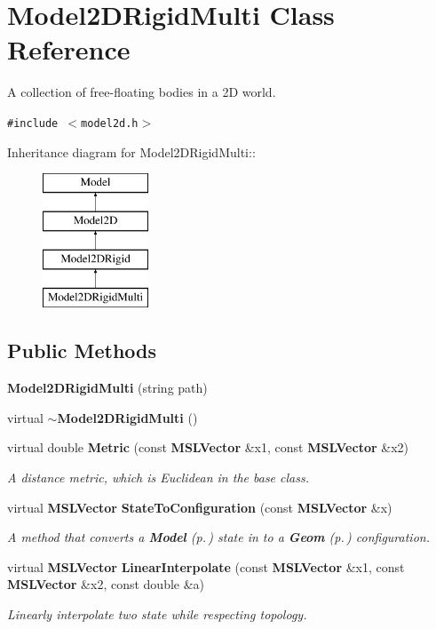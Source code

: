 \section{Model2DRigid\-Multi  Class Reference}
\label{class_Model2DRigidMulti}
A collection of free-floating bodies in a 2D world. 


{\tt \#include $<$model2d.h$>$}

Inheritance diagram for Model2DRigid\-Multi::\begin{figure}[H]
\begin{center}
\leavevmode
\includegraphics[height=4cm]{class_Model2DRigidMulti}
\end{center}
\end{figure}
\subsection*{Public Methods}
\begin{CompactItemize}
\item 
{\bf Model2DRigid\-Multi} (string path)
\item 
virtual {\bf $\sim$Model2DRigid\-Multi} ()
\item 
virtual double {\bf Metric} (const {\bf MSLVector} \&x1, const {\bf MSLVector} \&x2)
\begin{CompactList}\small\item\em A distance metric, which is Euclidean in the base class.\item\end{CompactList}\item 
virtual {\bf MSLVector} {\bf State\-To\-Configuration} (const {\bf MSLVector} \&x)
\begin{CompactList}\small\item\em A method that converts a {\bf Model} {\rm (p.\,\pageref{class_Model})} state in to a {\bf Geom} {\rm (p.\,\pageref{class_Geom})} configuration.\item\end{CompactList}\item 
virtual {\bf MSLVector} {\bf Linear\-Interpolate} (const {\bf MSLVector} \&x1, const {\bf MSLVector} \&x2, const double \&a)
\begin{CompactList}\small\item\em Linearly interpolate two state while respecting topology.\item\end{CompactList}\end{CompactItemize}
